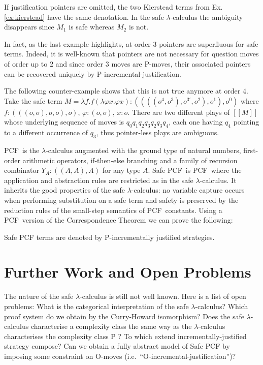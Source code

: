 \documentclass{llncs}
\newcommand{\sem}[1]{{[\![ #1 ]\!]}}
\newcommand\pcf{\textsf{PCF}}
\begin{document}
\begin{example} If justification pointers are omitted, the two Kierstead terms from Ex. \ref{ex:kierstead} have
the same denotation. In the safe $\lambda$-calculus the ambiguity disappears since $M_1$ is safe whereas $M_2$ is not.
\end{example}

In fact, as the last example highlights, at order $3$ pointers are superfluous for safe terms. Indeed, it is well-known that  pointers are not necessary for question moves of order up to $2$ and since order $3$ moves are P-moves, their associated pointers can be recovered uniquely by P-incremental-justification.

The following counter-example shows that this is not true anymore at order $4$. Take the safe term $M = \lambda f . f (\lambda \varphi x . \varphi x) : ((((o^4,o^3),o^{3'},o^2),o^1),o^0)$ where $f:(((o,o),o,o),o)$, $\varphi:(o,o)$, $x:o$. There are two different plays of $\sem{M}$ whose underlying sequence of moves is $q_0 q_1 q_2 q_3 q_2 q_3 q_4$, each one having $q_4$ pointing to a different occurrence of $q_3$, thus pointer-less plays are ambiguous.


\pcf\ is the $\lambda$-calculus augmented with the ground type of natural numbers, first-order arithmetic operators, if-then-else branching
and a family of recursion combinator $Y_A : ((A,A),A)$ for any type $A$.
Safe \pcf\ is \pcf\ where the application and abstraction rules are restricted as in the safe $\lambda$-calculus.
It inherits the good properties of the safe $\lambda$-calculus: no variable capture occurs when performing substitution on a safe term and safety is preserved by the reduction rules of the small-step semantics of \pcf\ constants. Using a \pcf\ version of the Correspondence Theorem we can prove the following:
\begin{theorem}
\label{thm:safepcfpincr}
Safe PCF terms are denoted by P-incrementally justified strategies.
\end{theorem}


\section{Further Work and Open Problems}

The nature of the safe $\lambda$-calculus is still not well known. Here is a list of open problems:
What is the categorical interpretation of the safe $\lambda$-calculus? Which proof system do we obtain by the Curry-Howard isomorphism? Does the safe $\lambda$-calculus characterise a complexity class the same way as the $\lambda$-calculus characterises the complexity class P \cite{DBLP:conf/tlca/LeivantM93}?
To which extend incrementally-justified strategy compose? Can we obtain a fully abstract model of Safe PCF by imposing some constraint on O-moves (i.e.\ ``O-incremental-justification'')?
\end{document}
